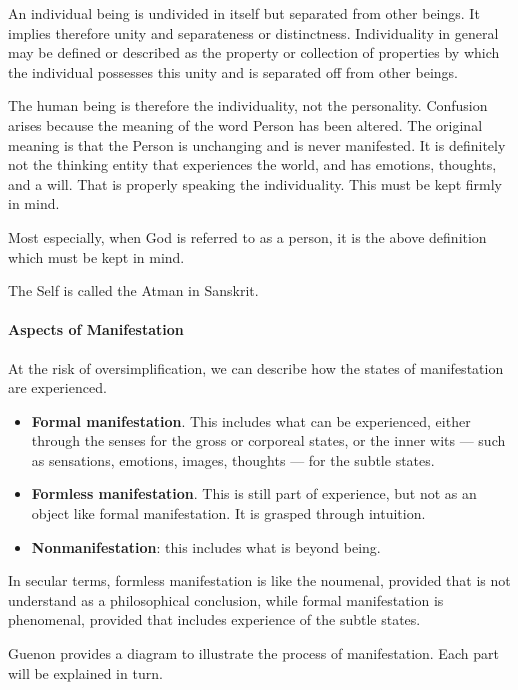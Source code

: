 \begin{quotex}
An individual being is undivided in itself but separated from other beings. It implies therefore unity and separateness or distinctness. Individuality in general may be defined or described as the property or collection of properties by which the individual possesses this unity and is separated off from other beings. 

\end{quotex}
The human being is therefore the individuality, not the personality. Confusion arises because the meaning of the word Person has been altered. The original meaning is that the Person is unchanging and is never manifested. It is definitely not the thinking entity that experiences the world, and has emotions, thoughts, and a will. That is properly speaking the individuality. This must be kept firmly in mind.

Most especially, when God is referred to as a person, it is the above definition which must be kept in mind.

The Self is called the Atman in Sanskrit.

\paragraph{Aspects of Manifestation}
At the risk of oversimplification, we can describe how the states of manifestation are experienced.

\begin{itemize}
\item \textbf{Formal manifestation}. This includes what can be experienced, either through the senses for the gross or corporeal states, or the inner wits — such as sensations, emotions, images, thoughts — for the subtle states. 
\item \textbf{Formless manifestation}. This is still part of experience, but not as an object like formal manifestation. It is grasped through intuition. 
\item \textbf{Nonmanifestation}: this includes what is beyond being. 
\end{itemize}
In secular terms, formless manifestation is like the noumenal, provided that is not understand as a philosophical conclusion, while formal manifestation is phenomenal, provided that includes experience of the subtle states.

Guenon provides a diagram to illustrate the process of manifestation. Each part will be explained in turn.


